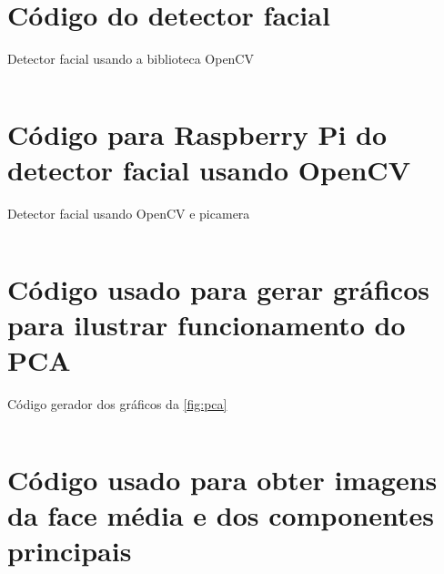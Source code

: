 
\begin{apendicesenv}

\partapendices

\chapter{Código do detector facial}\label{cap:anexo_detector_facial_opencv}

\begin{code}
\caption{Detector facial usando a biblioteca OpenCV}
\label{cod:detector_facial_opencv}
\inputminted{python}{codigos/detector_facial-imagem.py}
\end{code}

\chapter{Código para Raspberry Pi do detector facial usando OpenCV}\label{cap:anexo_detector_raspberry}

\begin{code}
\caption{Detector facial usando OpenCV e picamera}
\label{cod:detector_opencv_picamera}
\inputminted{python}{codigos/detector_facial-picamera.py}
\end{code}

\chapter{Código usado para gerar gráficos para ilustrar funcionamento do PCA}\label{cap:ilustra_pca}

\begin{code}
\caption{Código gerador dos gráficos da \autoref{fig:pca}}
\label{cod:ilustra_pca}
\inputminted{python}{codigos/ilustra_pca.py}
\end{code}

\chapter{Código usado para obter imagens da face média e dos componentes principais}\label{cap:pca_opencv}


\end{apendicesenv}
